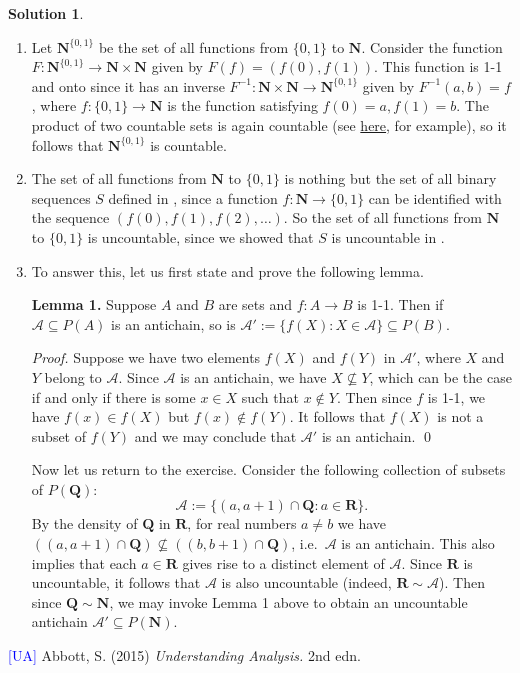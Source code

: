 \documentclass[12pt]{article}
\theoremstyle{definition}
\theoremstyle{exercise}
\theoremstyle{solution}
\newtheorem*{solution}{Solution}
\newcommand{\N}{\mathbf{N}}
\newcommand{\Q}{\mathbf{Q}}
\newcommand{\R}{\mathbf{R}}
\begin{document}
\begin{solution}
    \begin{enumerate}
        \item Let \( \N^{\{0,1\}} \) be the set of all functions from \( \{ 0, 1 \} \) to \( \N \). Consider the function \( F : \N^{\{0,1\}} \to \N \times \N \) given by \( F(f) = (f(0), f(1)) \). This function is 1-1 and onto since it has an inverse \( F^{-1} : \N \times \N \to \N^{\{0,1\}} \) given by \( F^{-1}(a, b) = f \), where \( f : \{ 0, 1 \} \to \N \) is the function satisfying \( f(0) = a, f(1) = b \). The product of two countable sets is again countable (see \href{https://lew98.github.io/Mathematics/Cardinality.pdf}{here}, for example), so it follows that \( \N^{\{0,1\}} \) is countable.

        \item The set of all functions from \( \N \) to \( \{ 0, 1 \} \) is nothing but the set of all binary sequences \( S \) defined in , since a function \( f : \N \to \{ 0, 1 \} \) can be identified with the sequence \( (f(0), f(1), f(2), \ldots) \). So the set of all functions from \( \N \) to \( \{ 0, 1 \} \) is uncountable, since we showed that \( S \) is uncountable in .

        \item To answer this, let us first state and prove the following lemma.

        \noindent \textbf{Lemma 1.} Suppose \( A \) and \( B \) are sets and \( f : A \to B \) is 1-1. Then if \( \mathcal{A} \subseteq P(A) \) is an antichain, so is \( \mathcal{A}' := \{ f(X) : X \in \mathcal{A} \} \subseteq P(B) \).

        \noindent \textit{Proof.} Suppose we have two elements \( f(X) \) and \( f(Y) \) in \( \mathcal{A}' \), where \( X \) and \( Y \) belong to \( \mathcal{A} \). Since \( \mathcal{A} \) is an antichain, we have \( X \not\subseteq Y \), which can be the case if and only if there is some \( x \in X \) such that \( x \not\in Y \). Then since \( f \) is 1-1, we have \( f(x) \in f(X) \) but \( f(x) \not\in f(Y) \). It follows that \( f(X) \) is not a subset of \( f(Y) \) and we may conclude that \( \mathcal{A}' \) is an antichain. \qed

        Now let us return to the exercise. Consider the following collection of subsets of \( P(\Q) \):
        \[
            \mathcal{A} := \{ (a, a + 1) \cap \Q : a \in \R \}.
        \]
        By the density of \( \Q \) in \( \R \), for real numbers \( a \neq b \) we have \( ((a, a + 1) \cap \Q) \not\subseteq ((b, b + 1) \cap \Q) \), i.e.\ \( \mathcal{A} \) is an antichain. This also implies that each \( a \in \R \) gives rise to a distinct element of \( \mathcal{A} \). Since \( \R \) is uncountable, it follows that \( \mathcal{A} \) is also uncountable (indeed, \( \R \sim \mathcal{A} \)). Then since \( \Q \sim \N \), we may invoke Lemma 1 above to obtain an uncountable antichain \( \mathcal{A}' \subseteq P(\N) \).
    \end{enumerate}
\end{solution}

\noindent \hrulefill

\noindent \hypertarget{ua}{\textcolor{blue}{[UA]} Abbott, S. (2015) \textit{Understanding Analysis.} 2nd edn.}
\end{document}
